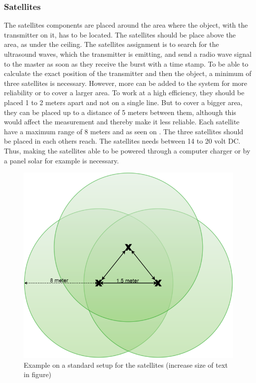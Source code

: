 \subsubsection{Satellites}
The satellites components are placed around the area where the object, with the transmitter on it, has to be located. The satellites should be place above the area, as under the ceiling. The satellites assignment is to search for the ultrasound waves, which the transmitter is emitting, and send a radio wave signal to the master as soon as they receive the burst with a time stamp.
To be able to calculate the exact position of the transmitter and then the object, a minimum of three satellites is necessary. However, more can be added to the system for more reliability or to cover a larger area. To work at a high efficiency, they should be placed 1 to 2 meters apart and not on a single line. But to cover a bigger area, they can be placed up to a distance of 5 meters between them, although this would affect the measurement and thereby make it less reliable. Each satellite have a maximum range of 8 meters and as seen on . The three satellites should be placed in each others reach. The satellites needs between 14 to 20 volt DC. Thus, making the satellites able to be powered through a computer charger or by a panel solar for example is necessary.

\begin{figure}[H]
	\centering
	\includegraphics[scale=0.5]{figures/ReceiverSetup.png}
	\caption{Example on a standard setup for the satellites (increase size of text in figure)}
	\label{fig:receiverSetup}
\end{figure}

